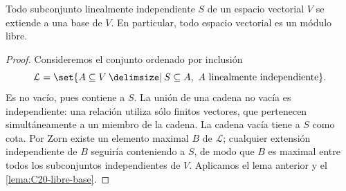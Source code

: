 \begin{prop}\label{prop:C20-extension-base}
Todo subconjunto linealmente independiente $S$ de un espacio vectorial $V$ se extiende a una base de $V$. En particular, todo espacio vectorial es un módulo libre.
\end{prop}
\begin{proof}
Consideremos el conjunto ordenado por inclusión
\[
\mathcal L=\set{A\subseteq V\given S\subseteq A,\ A\text{ linealmente independiente}}.
\]
Es no vacío, pues contiene a $S$. La unión de una cadena no vacía es independiente: una relación utiliza sólo finitos vectores, que pertenecen simultáneamente a un miembro de la cadena. La cadena vacía tiene a $S$ como cota. Por Zorn existe un elemento maximal $B$ de $\mathcal L$; cualquier extensión independiente de $B$ seguiría conteniendo a $S$, de modo que $B$ es maximal entre todos los subconjuntos independientes de $V$. Aplicamos el lema anterior y el \cref{lema:C20-libre-base}.
\end{proof}

